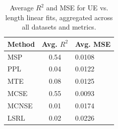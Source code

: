 \begin{table}
\footnotesize
\centering
\caption{Average $R^2$ and MSE for UE vs. length linear fits, aggregated across all datasets and metrics.}
\begin{tabular}{lc}
\toprule
Method & Avg. $R^2$ & Avg. MSE \\
\midrule
MSP & 0.54 & 0.0108 \\
PPL & 0.04 & 0.0122 \\
MTE & 0.08 & 0.0125 \\
MCSE & 0.55 & 0.0093 \\
MCNSE & 0.01 & 0.0174 \\
LSRL & 0.02 & 0.0226 \\
\midrule
\end{tabular}
\end{table}
